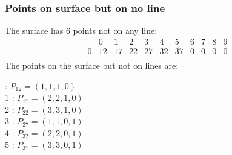 \documentclass{article}
\begin{document}
{\subsubsection*{Points on surface but on no line}
The surface has 6 points not on any line:\\
$$
\begin{array}{r|*{10}{r}}
 & 0 & 1 & 2 & 3 & 4 & 5 & 6 & 7 & 8 & 9\\
\hline
0 & 12 & 17 & 22 & 27 & 32 & 37 & 0 & 0 & 0 & 0\\
\end{array}
$$
The points on the surface but not on lines are:\\
\begin{multicols}{2}
 : $P_{12}=( 1, 1, 1, 0 )$\\
1 : $P_{17}=( 2, 2, 1, 0 )$\\
2 : $P_{22}=( 3, 3, 1, 0 )$\\
3 : $P_{27}=( 1, 1, 0, 1 )$\\
4 : $P_{32}=( 2, 2, 0, 1 )$\\
5 : $P_{37}=( 3, 3, 0, 1 )$\\
\end{multicols}
}
\end{document}
